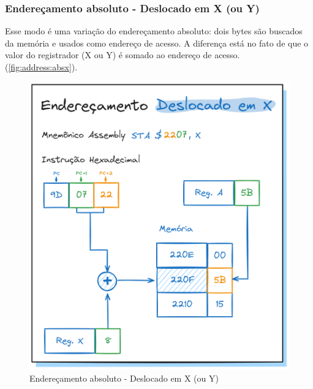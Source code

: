 \documentclass[
	12pt,				  %
	openright,		%
	a4paper,			%
	english,			%
	french,				%
	spanish,			%
	brazil,				%
]{abntex2}
\begin{document}
\subsubsection{Endereçamento absoluto - Deslocado em X (ou Y)}
Esse modo é uma variação do endereçamento absoluto: dois bytes são buscados da
memória e usados como endereço de acesso. A diferença está no fato de que o
valor do registrador (X ou Y) é somado ao endereço de acesso.
(\autoref{fig:address:absx}).
\begin{figure}[H]
	\centering
	\caption{Endereçamento absoluto - Deslocado em X (ou Y)}
	\label{fig:address:absx}
	\includegraphics[scale=0.25]{../assets/img/addressing-modes-absx.png}
\end{figure}
\end{document}
